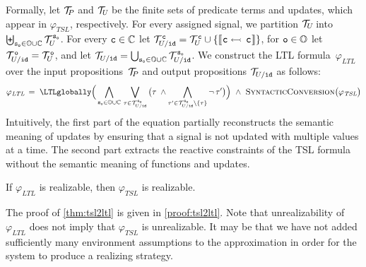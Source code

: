 Formally, let $ \mathcal{T}_{\!P\hspace{-0.5pt}} $ and $ \mathcal{T}_{\hspace{-0.5pt}U \!} $ be the finite sets of
predicate terms and updates, which appear in
$ \varphi_{\textit{TSL}} $, respectively. For every assigned signal, we
partition $ \mathcal{T}_{\hspace{-0.5pt}U \!} $ into
$ \biguplus_{{\text{\texttt{s}}}_{{\text{\texttt{o}}}} \in \mathbb{O} \cup \mathbb{C}}
\mathcal{T}_{\hspace{-0.5pt}U \!}^{\hspace{0.5pt}{\text{\texttt{s}}}_{{\text{\texttt{o}}}}} $. For every
$ {\text{\texttt{c}}} \in \mathbb{C} $ let \mbox{$\mathcal{T}_{\hspace{-0.5pt}U / {\text{\texttt{id}}}}^{\hspace{0.5pt}{\text{\texttt{c}}}} =
  \mathcal{T}_{\hspace{-0.5pt}U \!}^{\hspace{0.5pt}{\text{\texttt{c}}}} \cup \{  \llbracket \hspace{0.5pt} {\text{\texttt{c}}} \leftarrowtail \, {\text{\texttt{c}}} \hspace{0.5pt} \rrbracket
   \} $}, for $ {\text{\texttt{o}}} \in \mathbb{O} $ let
$ \mathcal{T}_{\hspace{-0.5pt}U / {\text{\texttt{id}}}}^{\hspace{0.5pt}{\text{\texttt{o}}}} = \mathcal{T}_{\hspace{-0.5pt}U \!}^{\hspace{0.5pt}{\text{\texttt{o}}}}
$, and let
$ \mathcal{T}_{\hspace{-0.5pt}U / {\text{\texttt{id}}}} = \bigcup_{{\text{\texttt{s}}}_{{\text{\texttt{o}}}} \in \mathbb{O} \cup \mathbb{C}}
\mathcal{T}_{\hspace{-0.5pt}U / {\text{\texttt{id}}}}^{\hspace{0.5pt}{\text{\texttt{s}}}_{{\text{\texttt{o}}}}} $.  We construct the LTL
formula~$ \varphi_{\textit{LTL}} $ over the input
propositions~$ \mathcal{T}_{\!P\hspace{-0.5pt}} $ and output propositions $ \mathcal{T}_{\hspace{-0.5pt}U / {\text{\texttt{id}}}} $ as
follows:
%
\begin{equation*}
  \varphi_{\textit{LTL}} \, = \;
  \LTLglobally \Big ( \bigwedge_{\name{s}_{\name{o}} \in \onames \cup \cells} \,
  \bigvee_{\term \in \utermsp^{\hspace{0.5pt}\name{s}_{\name{o}}}}
  \big( \term \; \wedge \bigwedge_{\term' \in
    \utermsp^{\hspace{0.5pt}\name{s}_{\name{o}}} \setminus
    \set{ \term }} \neg \, \term' \big)  \Big) \ \wedge \
  \textsc{SyntacticConversion}\big(\varphi_{\textit{TSL}}\big)
\end{equation*}
%
Intuitively, the first part of the equation partially reconstructs the semantic meaning of updates by ensuring that a signal is not updated with multiple values at a time.
The second part extracts the reactive constraints of the TSL formula without the semantic meaning of functions and updates.
%
\begin{theorem}
  \label{thm:tsl2ltl} If $ \varphi_{\textit{LTL}} $ is realizable, then $ \varphi_{\textit{TSL}} $ is realizable.
\end{theorem}
%
\noindent The proof of \cref{thm:tsl2ltl} is given in \cref{proof:tsl2ltl}.
Note that unrealizability of $\varphi_{\textit{LTL}} $ does not imply that $ \varphi_{\textit{TSL}}$ is unrealizable.
It may be that we have not added sufficiently many environment assumptions to the approximation in order for the system to produce a realizing strategy.

